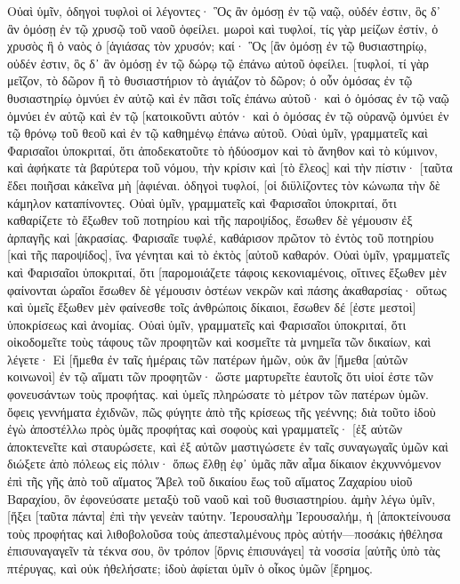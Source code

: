 Οὐαὶ ὑμῖν, ὁδηγοὶ τυφλοὶ οἱ λέγοντες· Ὃς ἂν ὀμόσῃ ἐν τῷ ναῷ, οὐδέν ἐστιν, ὃς δ᾽ ἂν ὀμόσῃ ἐν τῷ χρυσῷ τοῦ ναοῦ ὀφείλει. 
μωροὶ καὶ τυφλοί, τίς γὰρ μείζων ἐστίν, ὁ χρυσὸς ἢ ὁ ναὸς ὁ [ἁγιάσας τὸν χρυσόν; 
καί· Ὃς [ἂν ὀμόσῃ ἐν τῷ θυσιαστηρίῳ, οὐδέν ἐστιν, ὃς δ᾽ ἂν ὀμόσῃ ἐν τῷ δώρῳ τῷ ἐπάνω αὐτοῦ ὀφείλει. 
[τυφλοί, τί γὰρ μεῖζον, τὸ δῶρον ἢ τὸ θυσιαστήριον τὸ ἁγιάζον τὸ δῶρον; 
ὁ οὖν ὀμόσας ἐν τῷ θυσιαστηρίῳ ὀμνύει ἐν αὐτῷ καὶ ἐν πᾶσι τοῖς ἐπάνω αὐτοῦ· 
καὶ ὁ ὀμόσας ἐν τῷ ναῷ ὀμνύει ἐν αὐτῷ καὶ ἐν τῷ [κατοικοῦντι αὐτόν· 
καὶ ὁ ὀμόσας ἐν τῷ οὐρανῷ ὀμνύει ἐν τῷ θρόνῳ τοῦ θεοῦ καὶ ἐν τῷ καθημένῳ ἐπάνω αὐτοῦ. 
Οὐαὶ ὑμῖν, γραμματεῖς καὶ Φαρισαῖοι ὑποκριταί, ὅτι ἀποδεκατοῦτε τὸ ἡδύοσμον καὶ τὸ ἄνηθον καὶ τὸ κύμινον, καὶ ἀφήκατε τὰ βαρύτερα τοῦ νόμου, τὴν κρίσιν καὶ [τὸ ἔλεος] καὶ τὴν πίστιν· [ταῦτα ἔδει ποιῆσαι κἀκεῖνα μὴ [ἀφιέναι. 
ὁδηγοὶ τυφλοί, [οἱ διϋλίζοντες τὸν κώνωπα τὴν δὲ κάμηλον καταπίνοντες. 
Οὐαὶ ὑμῖν, γραμματεῖς καὶ Φαρισαῖοι ὑποκριταί, ὅτι καθαρίζετε τὸ ἔξωθεν τοῦ ποτηρίου καὶ τῆς παροψίδος, ἔσωθεν δὲ γέμουσιν ἐξ ἁρπαγῆς καὶ [ἀκρασίας. 
Φαρισαῖε τυφλέ, καθάρισον πρῶτον τὸ ἐντὸς τοῦ ποτηρίου [καὶ τῆς παροψίδος], ἵνα γένηται καὶ τὸ ἐκτὸς [αὐτοῦ καθαρόν. 
Οὐαὶ ὑμῖν, γραμματεῖς καὶ Φαρισαῖοι ὑποκριταί, ὅτι [παρομοιάζετε τάφοις κεκονιαμένοις, οἵτινες ἔξωθεν μὲν φαίνονται ὡραῖοι ἔσωθεν δὲ γέμουσιν ὀστέων νεκρῶν καὶ πάσης ἀκαθαρσίας· 
οὕτως καὶ ὑμεῖς ἔξωθεν μὲν φαίνεσθε τοῖς ἀνθρώποις δίκαιοι, ἔσωθεν δέ [ἐστε μεστοὶ] ὑποκρίσεως καὶ ἀνομίας. 
Οὐαὶ ὑμῖν, γραμματεῖς καὶ Φαρισαῖοι ὑποκριταί, ὅτι οἰκοδομεῖτε τοὺς τάφους τῶν προφητῶν καὶ κοσμεῖτε τὰ μνημεῖα τῶν δικαίων, 
καὶ λέγετε· Εἰ [ἤμεθα ἐν ταῖς ἡμέραις τῶν πατέρων ἡμῶν, οὐκ ἂν [ἤμεθα [αὐτῶν κοινωνοὶ] ἐν τῷ αἵματι τῶν προφητῶν· 
ὥστε μαρτυρεῖτε ἑαυτοῖς ὅτι υἱοί ἐστε τῶν φονευσάντων τοὺς προφήτας. 
καὶ ὑμεῖς πληρώσατε τὸ μέτρον τῶν πατέρων ὑμῶν. 
ὄφεις γεννήματα ἐχιδνῶν, πῶς φύγητε ἀπὸ τῆς κρίσεως τῆς γεέννης; 
διὰ τοῦτο ἰδοὺ ἐγὼ ἀποστέλλω πρὸς ὑμᾶς προφήτας καὶ σοφοὺς καὶ γραμματεῖς· [ἐξ αὐτῶν ἀποκτενεῖτε καὶ σταυρώσετε, καὶ ἐξ αὐτῶν μαστιγώσετε ἐν ταῖς συναγωγαῖς ὑμῶν καὶ διώξετε ἀπὸ πόλεως εἰς πόλιν· 
ὅπως ἔλθῃ ἐφ᾽ ὑμᾶς πᾶν αἷμα δίκαιον ἐκχυννόμενον ἐπὶ τῆς γῆς ἀπὸ τοῦ αἵματος Ἅβελ τοῦ δικαίου ἕως τοῦ αἵματος Ζαχαρίου υἱοῦ Βαραχίου, ὃν ἐφονεύσατε μεταξὺ τοῦ ναοῦ καὶ τοῦ θυσιαστηρίου. 
ἀμὴν λέγω ὑμῖν, [ἥξει [ταῦτα πάντα] ἐπὶ τὴν γενεὰν ταύτην. 
Ἰερουσαλὴμ Ἰερουσαλήμ, ἡ [ἀποκτείνουσα τοὺς προφήτας καὶ λιθοβολοῦσα τοὺς ἀπεσταλμένους πρὸς αὐτήν—ποσάκις ἠθέλησα ἐπισυναγαγεῖν τὰ τέκνα σου, ὃν τρόπον [ὄρνις ἐπισυνάγει] τὰ νοσσία [αὐτῆς ὑπὸ τὰς πτέρυγας, καὶ οὐκ ἠθελήσατε; 
ἰδοὺ ἀφίεται ὑμῖν ὁ οἶκος ὑμῶν [ἔρημος. 
